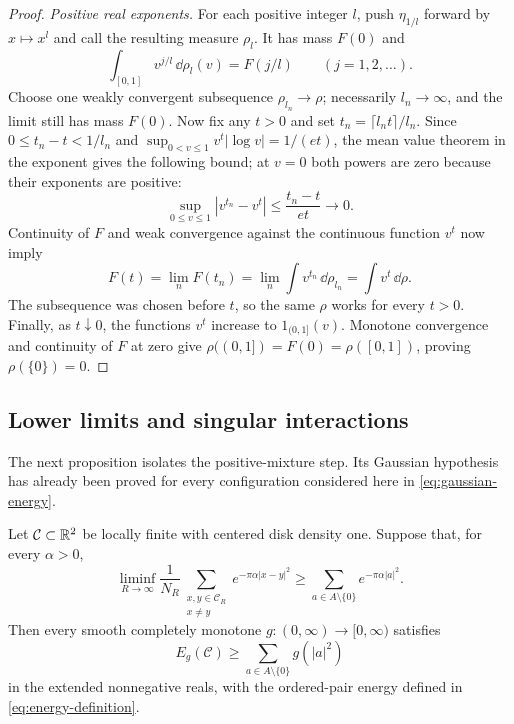 \begin{proof}
\emph{Positive real exponents.}
For each positive integer $l$, push $\eta_{1/l}$ forward by $x\mapsto x^l$
and call the resulting measure $\rho_l$.  It has mass $F(0)$ and
\[
 \int_{[0,1]}v^{j/l}\,\dd\rho_l(v)=F(j/l)
 \qquad(j=1,2,\ldots).
\]
Choose one weakly convergent subsequence $\rho_{l_n}\to\rho$; necessarily
$l_n\to\infty$, and the limit still has mass $F(0)$.
Now fix any $t>0$ and set $t_n=\lceil l_nt\rceil/l_n$.  Since
$0\le t_n-t<1/l_n$ and
$\sup_{0<v\le1}v^t|\log v|=1/(et)$, the mean value theorem in the exponent
gives the following bound; at $v=0$ both powers are zero because their
exponents are positive:
\[
 \sup_{0\le v\le1}|v^{t_n}-v^t|
 \le\frac{t_n-t}{et}\longrightarrow0.
\]
Continuity of $F$ and weak convergence against the continuous function $v^t$
now imply
\[
 F(t)=\lim_nF(t_n)
 =\lim_n\int v^{t_n}\,\dd\rho_{l_n}
 =\int v^t\,\dd\rho.
\]
The subsequence was chosen before $t$, so the same $\rho$ works for every
$t>0$.  Finally, as $t\downarrow0$, the functions $v^t$ increase to
$1_{(0,1]}(v)$.  Monotone convergence and continuity of $F$ at zero give
$\rho((0,1])=F(0)=\rho([0,1])$, proving $\rho(\{0\})=0$.
\end{proof}

\subsection{Lower limits and singular interactions}

The next proposition isolates the positive-mixture step.  Its Gaussian
hypothesis has already been proved for every configuration considered here
in \eqref{eq:gaussian-energy}.

\begin{proposition}\label{prop:energy-reduction}
Let $\mathcal C\subset\mathbb R^2$ be locally finite with centered disk density one.
Suppose that, for every $\alpha>0$,
\[
 \liminf_{R\to\infty}\frac1{N_R}
 \sum_{\substack{x,y\in\mathcal C_R\\x\ne y}}e^{-\pi\alpha|x-y|^2}
 \ge\sum_{a\in A\setminus\{0\}}e^{-\pi\alpha|a|^2}.
\]
Then every smooth completely monotone $g:(0,\infty)\to[0,\infty)$ satisfies
\begin{equation}\label{eq:full-energy-bound}
 E_g(\mathcal C)\ge\sum_{a\in A\setminus\{0\}}g(|a|^2)
\end{equation}
in the extended nonnegative reals, with the ordered-pair energy defined in
\eqref{eq:energy-definition}.
\end{proposition}

